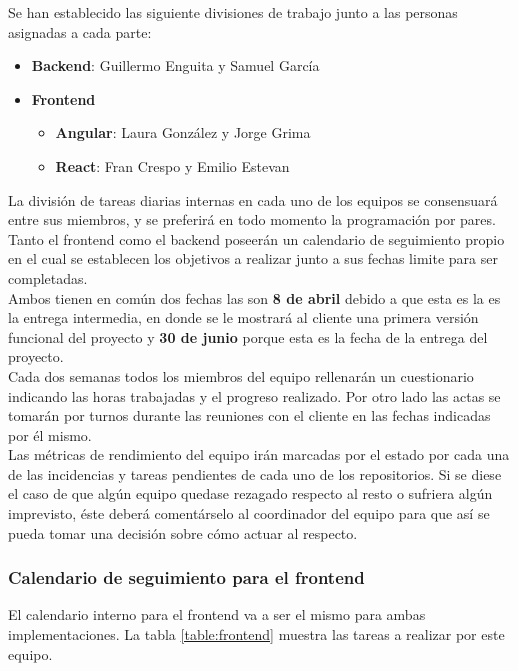 \documentclass[11pt, a4paper, titlepage]{article}
\begin{document}
Se han establecido las siguiente divisiones de trabajo junto a las personas asignadas a cada parte:

\begin{itemize}
    \item \textbf{Backend}: Guillermo Enguita y Samuel García
    \item \textbf{Frontend}
    \begin{itemize} 
        \item \textbf{Angular}: Laura González y Jorge Grima
        \item \textbf{React}: Fran Crespo y Emilio Estevan
    \end{itemize}
\end{itemize}

La división de tareas diarias internas en cada uno de los equipos se consensuará entre sus miembros, y se preferirá en todo momento la programación por pares.\\

Tanto el frontend como el backend poseerán un calendario de seguimiento propio en el cual se establecen los objetivos a realizar junto a sus fechas limite para ser completadas. \\

Ambos tienen en común dos fechas las son \textbf{8 de abril} debido a que esta es la es la entrega intermedia, en donde se le mostrará al cliente una primera versión funcional del proyecto
y \textbf{30 de junio} porque esta es la fecha de la entrega del proyecto.\\

Cada dos semanas todos los miembros del equipo rellenarán un cuestionario indicando las horas trabajadas y el progreso realizado. Por otro lado las actas se tomarán por turnos durante las reuniones con el cliente en las fechas indicadas por él mismo.\\

Las métricas de rendimiento del equipo irán marcadas por el estado por cada una de las incidencias y tareas pendientes de cada uno de los repositorios. Si se diese el caso de que algún equipo quedase rezagado respecto al resto o sufriera algún imprevisto, éste deberá comentárselo al coordinador del equipo para que así se pueda tomar una decisión sobre cómo actuar al respecto. 

\subsubsection{Calendario de seguimiento para el frontend}
El calendario interno para el frontend va a ser el mismo para ambas implementaciones. La tabla \ref{table:frontend} muestra las tareas a realizar por este equipo. \newline
\end{document}
